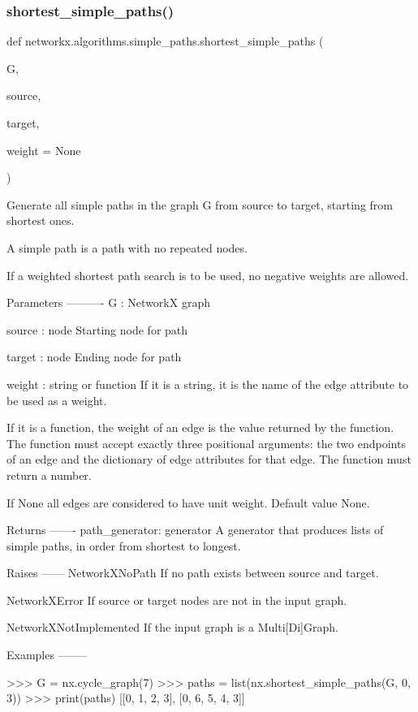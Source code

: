 \subsubsection{\texorpdfstring{shortest\+\_\+simple\+\_\+paths()}{shortest\_simple\_paths()}}
{\footnotesize\ttfamily def networkx.\+algorithms.\+simple\+\_\+paths.\+shortest\+\_\+simple\+\_\+paths (\begin{DoxyParamCaption}\item[{}]{G,  }\item[{}]{source,  }\item[{}]{target,  }\item[{}]{weight = {\ttfamily None} }\end{DoxyParamCaption})}

\begin{DoxyVerb}Generate all simple paths in the graph G from source to target,
   starting from shortest ones.

A simple path is a path with no repeated nodes.

If a weighted shortest path search is to be used, no negative weights
are allowed.

Parameters
----------
G : NetworkX graph

source : node
   Starting node for path

target : node
   Ending node for path

weight : string or function
    If it is a string, it is the name of the edge attribute to be
    used as a weight.

    If it is a function, the weight of an edge is the value returned
    by the function. The function must accept exactly three positional
    arguments: the two endpoints of an edge and the dictionary of edge
    attributes for that edge. The function must return a number.

    If None all edges are considered to have unit weight. Default
    value None.

Returns
-------
path_generator: generator
   A generator that produces lists of simple paths, in order from
   shortest to longest.

Raises
------
NetworkXNoPath
   If no path exists between source and target.

NetworkXError
   If source or target nodes are not in the input graph.

NetworkXNotImplemented
   If the input graph is a Multi[Di]Graph.

Examples
--------

>>> G = nx.cycle_graph(7)
>>> paths = list(nx.shortest_simple_paths(G, 0, 3))
>>> print(paths)
[[0, 1, 2, 3], [0, 6, 5, 4, 3]]


\end{DoxyVerb}
